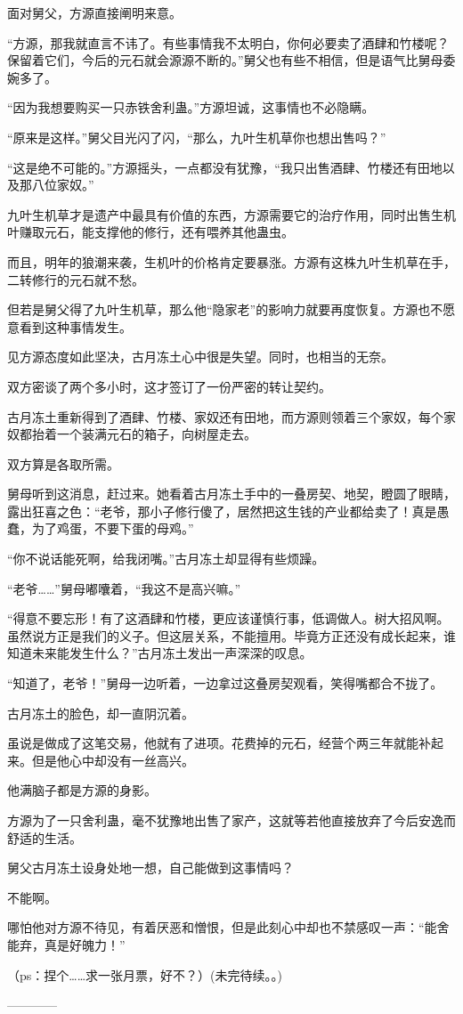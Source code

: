\begin{this_body}
面对舅父，方源直接阐明来意。

“方源，那我就直言不讳了。有些事情我不太明白，你何必要卖了酒肆和竹楼呢？保留着它们，今后的元石就会源源不断的。”舅父也有些不相信，但是语气比舅母委婉多了。

“因为我想要购买一只赤铁舍利蛊。”方源坦诚，这事情也不必隐瞒。

“原来是这样。”舅父目光闪了闪，“那么，九叶生机草你也想出售吗？”

“这是绝不可能的。”方源摇头，一点都没有犹豫，“我只出售酒肆、竹楼还有田地以及那八位家奴。”

九叶生机草才是遗产中最具有价值的东西，方源需要它的治疗作用，同时出售生机叶赚取元石，能支撑他的修行，还有喂养其他蛊虫。

而且，明年的狼潮来袭，生机叶的价格肯定要暴涨。方源有这株九叶生机草在手，二转修行的元石就不愁。

但若是舅父得了九叶生机草，那么他“隐家老”的影响力就要再度恢复。方源也不愿意看到这种事情发生。

见方源态度如此坚决，古月冻土心中很是失望。同时，也相当的无奈。

双方密谈了两个多小时，这才签订了一份严密的转让契约。

古月冻土重新得到了酒肆、竹楼、家奴还有田地，而方源则领着三个家奴，每个家奴都抬着一个装满元石的箱子，向树屋走去。

双方算是各取所需。

舅母听到这消息，赶过来。她看着古月冻土手中的一叠房契、地契，瞪圆了眼睛，露出狂喜之色：“老爷，那小子修行傻了，居然把这生钱的产业都给卖了！真是愚蠢，为了鸡蛋，不要下蛋的母鸡。”

“你不说话能死啊，给我闭嘴。”古月冻土却显得有些烦躁。

“老爷……”舅母嘟囔着，“我这不是高兴嘛。”

“得意不要忘形！有了这酒肆和竹楼，更应该谨慎行事，低调做人。树大招风啊。虽然说方正是我们的义子。但这层关系，不能擅用。毕竟方正还没有成长起来，谁知道未来能发生什么？”古月冻土发出一声深深的叹息。

“知道了，老爷！”舅母一边听着，一边拿过这叠房契观看，笑得嘴都合不拢了。

古月冻土的脸色，却一直阴沉着。

虽说是做成了这笔交易，他就有了进项。花费掉的元石，经营个两三年就能补起来。但是他心中却没有一丝高兴。

他满脑子都是方源的身影。

方源为了一只舍利蛊，毫不犹豫地出售了家产，这就等若他直接放弃了今后安逸而舒适的生活。

舅父古月冻土设身处地一想，自己能做到这事情吗？

不能啊。

哪怕他对方源不待见，有着厌恶和憎恨，但是此刻心中却也不禁感叹一声：“能舍能弃，真是好魄力！”

（ps：捏个……求一张月票，好不？）(未完待续。。)

------------

\end{this_body}


